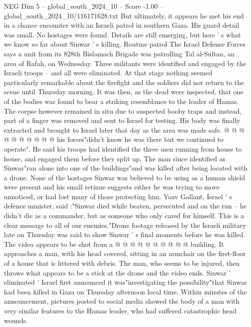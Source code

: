 \begin{textsample}{NEG Dim 5 – global\_south\_2024\_10 – Score -1.00 – global\_south\_2024\_10/116171628.txt}  \label{ex:f5_neg_137}
But ultimately, it appears he met his end in a chance encounter with an Israeli patrol in southern Gaza.
His guard detail was small.
No hostages were found.
Details are still emerging, but here ' s what we know so far about Sinwar ' s killing.
Routine patrol The Israel Defense Forces says a unit from its 828th Bislamach Brigade was patrolling Tal al-Sultan, an area of Rafah, on Wednesday.
Three militants were identified and engaged by the Israeli troops -- and all were eliminated.
At that stage nothing seemed particularly remarkable about the firefight and the soldiers did not return to the scene until Thursday morning.
It was then, as the dead were inspected, that one of the bodies was found to bear a striking resemblance to the leader of Hamas.
The corpse however remained in situ due to suspected booby traps and instead, part of a finger was removed and sent to Israel for testing.
His body was finally extracted and brought to Israel later that day as the area was made safe. @ @ @ @ @ @ @ @ @ @ his forces"didn't know he was there but we continued to operate".
He said his troops had identified the three men running from house to house, and engaged them before they split up.
The man since identified as Sinwar"ran alone into one of the buildings"and was killed after being located with a drone.
None of the hostages Sinwar was believed to be using as a human shield were present and his small retinue suggests either he was trying to move unnoticed, or had lost many of those protecting him.
Yoav Gallant, Israel ' s defence minister, said :"Sinwar died while beaten, persecuted and on the run -- he didn't die as a commander, but as someone who only cared for himself.
This is a clear message to all of our enemies."Drone footage released by the Israeli military late on Thursday was said to show Sinwar ' s final moments before he was killed.
The video appears to be shot from a @ @ @ @ @ @ @ @ @ @ building.
It approaches a man, with his head covered, sitting in an armchair on the first-floor of a house that is littered with debris.
The man, who seems to be injured, then throws what appears to be a stick at the drone and the video ends.
Sinwar ' eliminated ' Israel first announced it was"investigating the possibility"that Sinwar had been killed in Gaza on Thursday afternoon local time.
Within minutes of the announcement, pictures posted to social media showed the body of a man with very similar features to the Hamas leader, who had suffered catastrophic head wounds.

\end{textsample}
